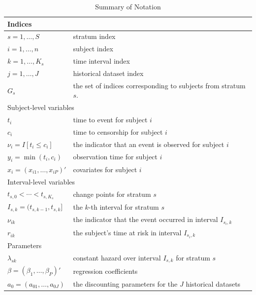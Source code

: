 \begin{table}[H]
\centering
\begin{tabular}{l|l}
\hline
\multicolumn{2}{l}{Indices} \\
\hline
$s=1,\dots,S$ & stratum index\\
$i=1,\dots,n$ & subject index\\
$k=1,\dots,K_s$ & time interval index\\
$j=1,\dots,J$ & historical dataset index\\
$G_s$ & the set of indices corresponding to subjects from stratum $s$.\\
\hline
\multicolumn{2}{l}{Subject-level variables} \\
\hline
$t_i$ & time to event for subject $i$\\
$c_i$ & time to censorship for subject $i$\\
$\nu_i=I[t_i \le c_i]$ & the indicator that an event is observed for subject $i$\\
$y_i=\min(t_i, c_i)$ & observation time for subject $i$\\
$x_i=(x_{i1},\dots,x_{iP})'$ & covariates for subject $i$\\
\hline
\multicolumn{2}{l}{Interval-level variables}\\
\hline
$t_{s,0} < \cdots < t_{s,K_s}$ & change points for stratum $s$\\
$I_{s,k}=(t_{s,k-1}, t_{s,k}]$ & the $k$-th interval for stratum $s$\\
$\nu_{ik}$ & the indicator that the event occurred in interval $I_{s_i,k}$\\
$r_{ik}$ & the subject's time at risk in interval $I_{s_i,k}$\\
\hline
\multicolumn{2}{l}{Parameters}\\
\hline
$\lambda_{sk}$ & constant hazard over interval $I_{s,k}$ for stratum $s$\\
$\beta=(\beta_1,\dots,\beta_P)'$ & regression coefficients\\
$a_0=(a_{01},\dots,a_{0J})$ & the discounting parameters for the $J$ historical datasets\\
\hline
\end{tabular}
\caption{Summary of Notation}
\label{notation}
\end{table}

